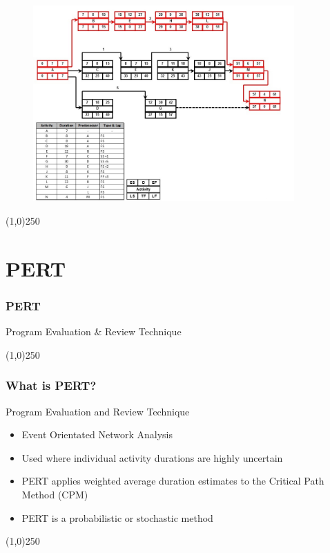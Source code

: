 \begin{frame}
\begin{figure}
	\centering
		\includegraphics[width = 10.0cm]{oldnotes/Slide240.jpg}
\end{figure}
\end{frame}
\begin{center}\line(1,0){250}\end{center}


\section{PERT}






\begin{frame}
\frametitle{PERT}
Program Evaluation \& Review Technique
\end{frame}
\begin{center}\line(1,0){250}\end{center}





\begin{frame}
\frametitle{What is PERT?}
Program Evaluation and Review Technique
\begin{itemize}
	\item Event Orientated Network Analysis
	\item Used where individual activity durations are highly uncertain
	\item PERT applies weighted average duration estimates to the Critical Path Method (CPM)
	\item PERT is a probabilistic or stochastic method
\end{itemize}
\end{frame}
\begin{center}\line(1,0){250}\end{center}





